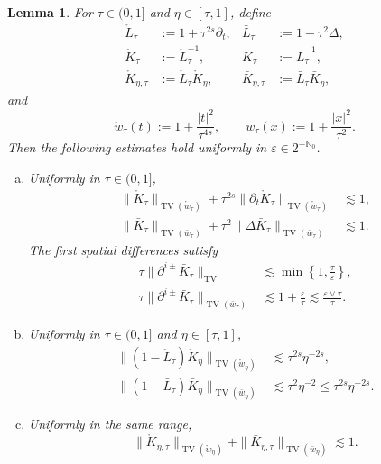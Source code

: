 \documentclass{article}
\numberwithin{equation}{section}
\newcommand{\assign}{:=}
\theoremstyle{plain}
\newtheorem{lemma}[theorem]{Lemma}
\theoremstyle{definition}
\begin{document}
\begin{lemma}
	\label{lem:K-kernel-aux}
	For \(\tau\in(0,1]\) and \(\eta\in[\tau,1]\), define
	\begin{align*}
			\mathring L_\tau&\assign1+\tau^{2s}\partial_t,
		&
		\bar L_\tau&\assign1-\tau^2\Delta,
		\\
			\mathring K_\tau&\assign\mathring L_\tau^{-1},
		&
		\bar K_\tau&\assign\bar L_\tau^{-1},
		\\
			\mathring K_{\eta,\tau}&\assign\mathring L_\tau\mathring K_\eta,
		&
		\bar K_{\eta,\tau}&\assign\bar L_\tau\bar K_\eta,
	\end{align*}
	and
	\[
		\mathring w_\tau(t)\assign1+\frac{|t|^2}{\tau^{4s}},
	\qquad
	\bar w_\tau(x)\assign1+\frac{|x|^2}{\tau^2}.
	\]
	Then the following estimates hold uniformly in
	\(\varepsilon\in2^{-\mathbb N_0}\).
	
	\begin{enumerate}[(a)]
		\item Uniformly in \(\tau\in(0,1]\),
		\begin{align}
				\|\mathring K_\tau\|_{\operatorname{TV}(\mathring w_\tau)}
				+
				\tau^{2s}\|\partial_t\mathring K_\tau\|
				_{\operatorname{TV}(\mathring w_\tau)}
			&\lesssim1,
			\label{eq:K-aux-time}
			\\
			\|\bar K_\tau\|_{\operatorname{TV}(\bar w_\tau)}
			+
			\tau^2\|\Delta\bar K_\tau\|
			_{\operatorname{TV}(\bar w_\tau)}
			&\lesssim1.
			\label{eq:K-aux-space-zero-two}
		\end{align}
		The first spatial differences satisfy
		\begin{align}
			\tau\|\partial^{i\pm}\bar K_\tau\|_{\operatorname{TV}}
			&\lesssim
			\min\left\{1,\frac{\tau}{\varepsilon}\right\},
			\label{eq:K-aux-gradient-unweighted}
			\\
			\tau\|\partial^{i\pm}\bar K_\tau\|
			_{\operatorname{TV}(\bar w_\tau)}
			&\lesssim
			1+\frac{\varepsilon}{\tau}
			\lesssim
			\frac{\varepsilon\vee\tau}{\tau}.
			\label{eq:K-aux-gradient-weighted}
		\end{align}
		
		\item Uniformly in \(\tau\in(0,1]\) and \(\eta\in[\tau,1]\),
		\begin{align}
				\|(1-\mathring L_\tau)\mathring K_\eta\|
				_{\operatorname{TV}(\mathring w_\eta)}
			&\lesssim\tau^{2s}\eta^{-2s},
			\label{eq:K-aux-time-cross}
			\\
			\|(1-\bar L_\tau)\bar K_\eta\|
			_{\operatorname{TV}(\bar w_\eta)}
			&\lesssim\tau^2\eta^{-2}
			\leq\tau^{2s}\eta^{-2s}.
			\label{eq:K-aux-space-cross}
		\end{align}
		
		\item Uniformly in the same range,
		\begin{equation}
				\|\mathring K_{\eta,\tau}\|_{\operatorname{TV}(\mathring w_\eta)}
			+
			\|\bar K_{\eta,\tau}\|_{\operatorname{TV}(\bar w_\eta)}
			\lesssim1.
			\label{eq:K-aux-cross-kernels}
		\end{equation}
	\end{enumerate}
\end{lemma}
\end{document}
